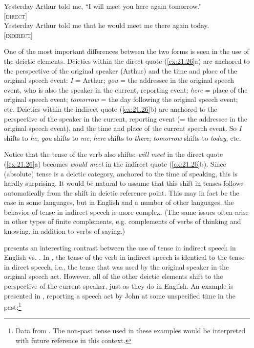 \ea \label{ex:21.26}
\ea  Yesterday Arthur told me, “I will meet you here again tomorrow.” \\ 
\hfill  [\textsc{direct}]\\
\ex Yesterday Arthur told me that he would meet me there again today. \\
\hfill [\textsc{indirect}]
                       \z
\z


One of the most important differences between the two forms is seen in the use of the deictic elements. Deictics within the direct quote (\ref{ex:21.26}a) are anchored to the perspective of the original speaker (Arthur) and the time and place of the original speech event: \textit{I} = Arthur; \textit{you} = the addressee in the original speech event, who is also the speaker in the current, reporting event; \textit{here} = place of the original speech event; \textit{tomorrow} = the day following the original speech event; etc. Deictics within the indirect quote (\ref{ex:21.26}b) are anchored to the perspective of the speaker in the current, reporting event (= the addressee in the original speech event), and the time and place of the current speech event. So \textit{I} shifts to \textit{he}; \textit{you} shifts to \textit{me}; \textit{here} shifts to \textit{there}; \textit{tomorrow} shifts to \textit{today}, etc.



Notice that the tense of the verb also shifts: \textit{will meet} in the direct quote (\ref{ex:21.26}a) becomes \textit{would meet} in the indirect quote (\ref{ex:21.26}b). Since (absolute) tense is a deictic category, anchored to the time of speaking, this is hardly surprising. It would be natural to assume that this shift in tenses follows automatically from the shift in deictic reference point. This may in fact be the case in some languages, but in English and a number of other languages, the behavior of tense in indirect speech is more complex. (The same issues often arise in other types of finite complements, e.g. complements of verbs of thinking and knowing, in addition to verbs of saying.)



\citet{Comrie1985} presents an interesting contrast between the use of tense in indirect speech in English vs. . In , the tense of the verb in indirect speech is identical to the tense in direct speech, i.e., the tense that was used by the original speaker in the original speech act. However, all of the other deictic elements shift to the perspective of the current speaker, just as they do in English. An example is presented in , reporting a speech act by John at some unspecified time in the past:\footnote{Data from \citet[109]{Comrie1985}. The non-past tense used in these examples would be interpreted with future reference in this context.}


